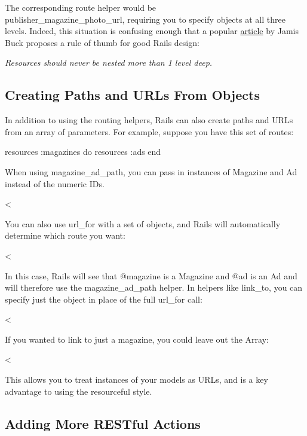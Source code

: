 \documentclass[10pt]{book}
\newenvironment{code}{%
  \scriptsize
    \verbatim
}{%
    \endverbatim
    \newline
}
\begin{document}
The corresponding route helper would be \\ publisher\_magazine\_photo\_url, requiring you to specify objects at all three levels. Indeed, this situation is confusing enough that a popular \href{http://weblog.jamisbuck.org/2007/2/5/nesting-resources}{article} by Jamis Buck proposes a rule of thumb for good Rails design:

\emph{Resources should never be nested more than 1 level deep.}

\subsection{ Creating Paths and URLs From Objects}

In addition to using the routing helpers, Rails can also create paths  and URLs from an array of parameters. For example, suppose you have  this set of routes:
\begin{code}
resources :magazines do
  resources :ads
end
\end{code}

When using magazine\_ad\_path, you can pass in instances of Magazine and Ad instead of the numeric IDs.
\begin{code}
<%
\end{code}

You can also use url\_for with a set of objects, and Rails will automatically determine which route you want:
\begin{code}
<%
\end{code}

In this case, Rails will see that @magazine is a Magazine and @ad is an Ad and will therefore use the magazine\_ad\_path helper. In helpers like link\_to, you can specify just the object in place of the full url\_for call:
\begin{code}
<%
\end{code}

If you wanted to link to just a magazine, you could leave out the Array:
\begin{code}
<%
\end{code}

This allows you to treat instances of your models as URLs, and is a key advantage to using the resourceful style.

\subsection{ Adding More RESTful Actions}
\end{document}
